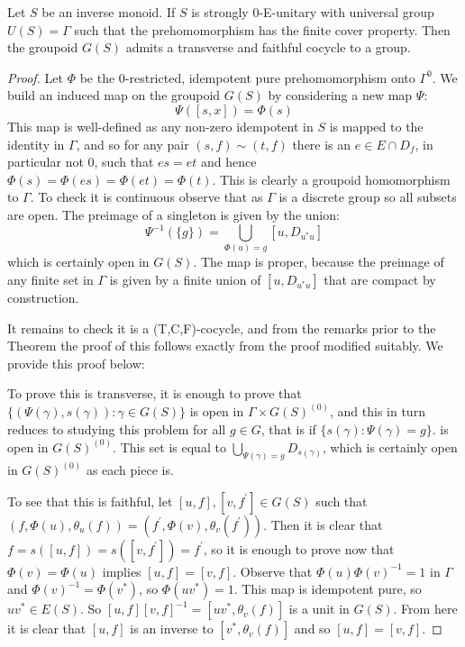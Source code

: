 \begin{theorem}\label{Thm:IT2-a}
Let $S$ be an inverse monoid. If $S$ is strongly 0-E-unitary with universal group $U(S)=\Gamma$ such that the prehomomorphism has the finite cover property. Then the groupoid $G(S)$ admits a transverse and faithful cocycle to a group.
\end{theorem}
\begin{proof}
Let $\Phi$ be the 0-restricted, idempotent pure prehomomorphism onto $\Gamma^{0}$. We build an induced map on the groupoid $G(S)$ by considering a new map $\Psi:$
\begin{equation*}
\Psi([s,x])=\Phi(s)
\end{equation*}
This map is well-defined as any non-zero idempotent in $S$ is mapped to the identity in $\Gamma$, and so for any pair $(s,f) \sim (t,f)$ there is an $e \in E \cap D_{f}$, in particular not $0$, such that $es=et$ and hence $\Phi(s)=\Phi(es)=\Phi(et)=\Phi(t)$. This is clearly a groupoid homomorphism to $\Gamma$. To check it is continuous observe that as $\Gamma$ is a discrete group so all subsets are open. The preimage of a singleton is given by the union:
\begin{equation*}
\Psi^{-1}(\lbrace g \rbrace)=\bigcup_{\Phi(u)=g}[u,D_{u^{*}u}] 
\end{equation*}
which is certainly open in $G(S)$. The map is proper, because the preimage of any finite set in $\Gamma$ is given by a finite union of $[u,D_{u^{*}u}]$ that are compact by construction.

It remains to check it is a (T,C,F)-cocycle, and from the remarks prior to the Theorem the proof of this follows exactly from the proof \cite[Proposition 3.6]{MR1900993} modified suitably. We provide this proof below:

To prove this is transverse, it is enough to prove that $\lbrace (\Psi(\gamma),s(\gamma)):\gamma \in G(S)\rbrace$ is open in $\Gamma \times G(S)^{(0)}$, and this in turn reduces to studying this problem for all $g \in G$, that is if $\lbrace s(\gamma) :\Psi(\gamma)=g \rbrace$. is open in $G(S)^{(0)}$. This set is equal to $\bigcup_{\Psi(\gamma)=g}D_{s(\gamma)}$, which is certainly open in $G(S)^{(0)}$ as each piece is.

To see that this is faithful, let $[u,f], [v,f^{'}] \in G(S)$ such that $(f,\Phi(u),\theta_{u}(f))=(f^{'},\Phi(v),\theta_{v}(f^{'}))$. Then it is clear that $f=s([u,f])=s([v,f^{'}])=f^{'}$, so it is enough to prove now that $\Phi(v)=\Phi(u)$ implies $[u,f]=[v,f]$. Observe that $\Phi(u)\Phi(v)^{-1}=1$ in $\Gamma$ and $\Phi(v)^{-1}=\Phi(v^{*})$, so $\Phi(uv^{*})=1$. This map is idempotent pure, so $uv^{*} \in E(S)$. So $[u,f][v,f]^{-1}=[uv^{*},\theta_{v}(f)]$ is a unit in $G(S)$. From here it is clear that $[u,f]$ is an inverse to $[v^{*},\theta_{v}(f)]$ and so $[u,f]=[v,f]$.\end{proof}

